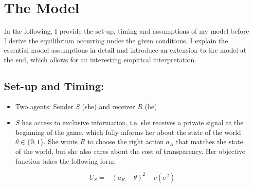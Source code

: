 \documentclass[paper=a4,12pt,DIV=11,twoside=false]{scrartcl}
\begin{document}
\section{The Model}

\noindent In the following, I provide the set-up, timing and assumptions of my model before I derive the equilibrium occurring under the given conditions. I explain the essential model assumptions in detail and introduce an extension to the model at the end, which allows for an interesting empirical interpretation.

\subsection{Set-up and Timing:}

\begin{itemize}
\item Two agents: Sender $S$ (she) and receiver $R$ (he)
\item $S$ has access to exclusive information, i.e. she receives a private signal at the beginning of the game, which fully informs her about the state of the world $\theta \in \{0,1\}$. She wants $R$ to choose the right action $a_R$ that matches the state of the world, but she also cares about the cost of transparency. Her objective function takes the following form: 

\begin{equation}
U_S = -(a_R - \theta)^2 - c(\sigma^2)
\end{equation}


\end{itemize}
\end{document}
